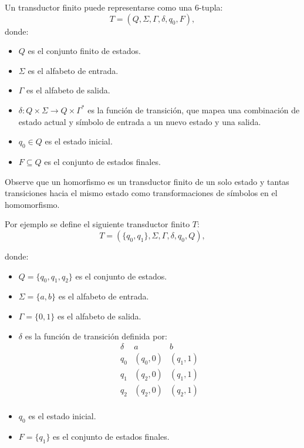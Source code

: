 \documentclass[12pt]{article}
\begin{document}
Un transductor finito puede representarse como una 6-tupla:
\[
      T = (Q, \Sigma, \Gamma, \delta, q_0, F),
\]
donde:
\begin{itemize}
      \item \(Q\) es el conjunto finito de estados.
      \item \(\Sigma\) es el alfabeto de entrada.
      \item \(\Gamma\) es el alfabeto de salida.
      \item \(\delta: Q \times \Sigma \to Q \times \Gamma^*\) es la función de transición, que mapea una combinación de estado actual y símbolo de entrada a un nuevo estado y una salida.
      \item \(q_0 \in Q\) es el estado inicial.
      \item \(F \subseteq Q\) es el conjunto de estados finales.
\end{itemize}

Observe que un homorfismo es un transductor finito de un solo estado y tantas transiciones hacia el mismo estado como transformaciones
de símbolos en el homomorfismo.

Por ejemplo se define el siguiente transductor finito $T$:
\[
      T = (\{q_0, q_1\}, \Sigma, \Gamma, \delta, q_0, Q),
\]

donde:

\begin{itemize}
      \item \(Q = \{q_0, q_1, q_2\}\) es el conjunto de estados.
      \item \(\Sigma = \{a, b\}\) es el alfabeto de entrada.
      \item \(\Gamma = \{0, 1\}\) es el alfabeto de salida.
      \item \(\delta\) es la función de transición definida por:
            \[
                  \begin{array}{c|c|c}
                        \delta & a        & b        \\
                        \hline
                        q_0    & (q_0, 0) & (q_1, 1) \\
                        q_1    & (q_2, 0) & (q_1, 1) \\
                        q_2    & (q_2, 0) & (q_2, 1) \\
                  \end{array}
            \]
      \item \(q_0\) es el estado inicial.
      \item \(F = \{q_1\}\) es el conjunto de estados finales.
\end{itemize}
\end{document}
